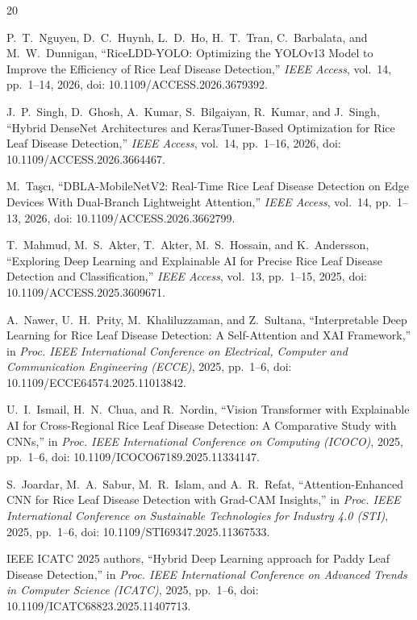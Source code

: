 \documentclass[conference]{IEEEtran}
\begin{document}
\begin{thebibliography}{20}

 P.~T.~Nguyen, D.~C.~Huynh, L.~D.~Ho, H.~T.~Tran, C.~Barbalata, and M.~W.~Dunnigan, ``RiceLDD-YOLO: Optimizing the YOLOv13 Model to Improve the Efficiency of Rice Leaf Disease Detection,'' \textit{IEEE Access}, vol.~14, pp.~1--14, 2026, doi: 10.1109/ACCESS.2026.3679392.

 J.~P.~Singh, D.~Ghosh, A.~Kumar, S.~Bilgaiyan, R.~Kumar, and J.~Singh, ``Hybrid DenseNet Architectures and KerasTuner-Based Optimization for Rice Leaf Disease Detection,'' \textit{IEEE Access}, vol.~14, pp.~1--16, 2026, doi: 10.1109/ACCESS.2026.3664467.

 M.~Ta{\c{s}}c{\i}, ``DBLA-MobileNetV2: Real-Time Rice Leaf Disease Detection on Edge Devices With Dual-Branch Lightweight Attention,'' \textit{IEEE Access}, vol.~14, pp.~1--13, 2026, doi: 10.1109/ACCESS.2026.3662799.

 T.~Mahmud, M.~S.~Akter, T.~Akter, M.~S.~Hossain, and K.~Andersson, ``Exploring Deep Learning and Explainable AI for Precise Rice Leaf Disease Detection and Classification,'' \textit{IEEE Access}, vol.~13, pp.~1--15, 2025, doi: 10.1109/ACCESS.2025.3609671.

 A.~Nawer, U.~H.~Prity, M.~Khaliluzzaman, and Z.~Sultana, ``Interpretable Deep Learning for Rice Leaf Disease Detection: A Self-Attention and XAI Framework,'' in \textit{Proc. IEEE International Conference on Electrical, Computer and Communication Engineering (ECCE)}, 2025, pp.~1--6, doi: 10.1109/ECCE64574.2025.11013842.

 U.~I.~Ismail, H.~N.~Chua, and R.~Nordin, ``Vision Transformer with Explainable AI for Cross-Regional Rice Leaf Disease Detection: A Comparative Study with CNNs,'' in \textit{Proc. IEEE International Conference on Computing (ICOCO)}, 2025, pp.~1--6, doi: 10.1109/ICOCO67189.2025.11334147.

 S.~Joardar, M.~A.~Sabur, M.~R.~Islam, and A.~R.~Refat, ``Attention-Enhanced CNN for Rice Leaf Disease Detection with Grad-CAM Insights,'' in \textit{Proc. IEEE International Conference on Sustainable Technologies for Industry 4.0 (STI)}, 2025, pp.~1--6, doi: 10.1109/STI69347.2025.11367533.

 IEEE ICATC 2025 authors, ``Hybrid Deep Learning approach for Paddy Leaf Disease Detection,'' in \textit{Proc. IEEE International Conference on Advanced Trends in Computer Science (ICATC)}, 2025, pp.~1--6, doi: 10.1109/ICATC68823.2025.11407713.


\end{thebibliography}
\end{document}
